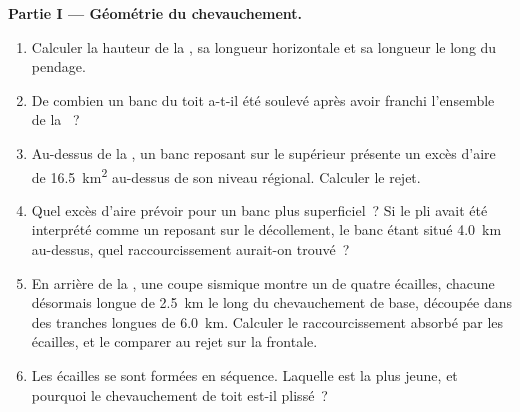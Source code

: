 \begin{problem}
\medskip\noindent\textbf{Partie I --- Géométrie du chevauchement.}
\begin{enumerate}
  \item Calculer la hauteur de la , sa longueur horizontale et sa longueur
        le long du pendage.
  \item De combien un banc du toit a-t-il été soulevé après avoir franchi
        l'ensemble de la ~?
  \item Au-dessus de la , un banc reposant sur le  supérieur présente un excès
        d'aire de \qty{16.5}{km^2} au-dessus de son niveau régional. Calculer le rejet.
  \item Quel excès d'aire prévoir pour un banc plus superficiel~? Si le pli avait
        été interprété comme un  reposant sur le décollement, le banc
        étant situé \qty{4.0}{km} au-dessus, quel raccourcissement aurait-on trouvé~?
  \item En arrière de la , une coupe sismique montre un  de quatre écailles, chacune
        désormais longue de \qty{2.5}{km} le long du chevauchement de base, découpée dans des tranches
        longues de \qty{6.0}{km}. Calculer le raccourcissement absorbé par les écailles, et
        le comparer au rejet sur la  frontale.
  \item Les écailles se sont formées en séquence. Laquelle est la plus jeune, et pourquoi le
        chevauchement de toit est-il plissé~?
\end{enumerate}


\end{problem}
